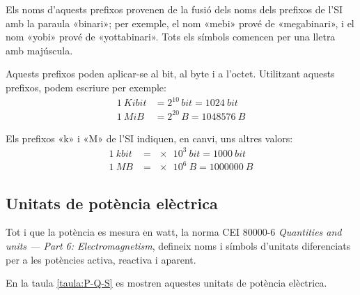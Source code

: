 \vspace{-4mm}
Els noms d'aquests prefixos provenen de la fusió dels noms dels prefixos de l'SI amb la paraula «binari»; per exemple, el nom «mebi» prové de «megabinari», i el nom «yobi» prové de «yottabinari». Tots els símbols comencen per una lletra amb majúscula. 

Aquests prefixos poden aplicar-se  al bit, al byte i a l'octet. Utilitzant aquests prefixos, podem escriure per exemple:
\begin{align*}
	\qty{1}{Kibit} &= 2^{10}\unit{\,bit} = \qty{1024}{bit} \\
	\qty{1}{MiB} &= 2^{20}\unit{\,B} = \qty{1048576}{B}
\end{align*}


Els prefixos «k» i «M» de l'SI indiquen, en canvi, uns altres valors:
\begin{align*}
	\qty{1}{kbit} &= \qty[print-unity-mantissa = false]{e3}{bit} = \qty{1000}{bit} \\
	\qty{1}{MB} &=\qty[print-unity-mantissa = false]{e6}{B} = \qty{1000000}{B}
\end{align*}


\subsection{Unitats de potència elèctrica}

Tot i que la potència es mesura en watt, la norma CEI 80000-6 \textit{Quantities and units --- Part 6: Electromagnetism}, defineix noms i símbols d'unitats diferenciats per a les potències activa, reactiva i aparent.

En la taula \vref{taula:P-Q-S} es mostren aquestes unitats de potència elèctrica.

